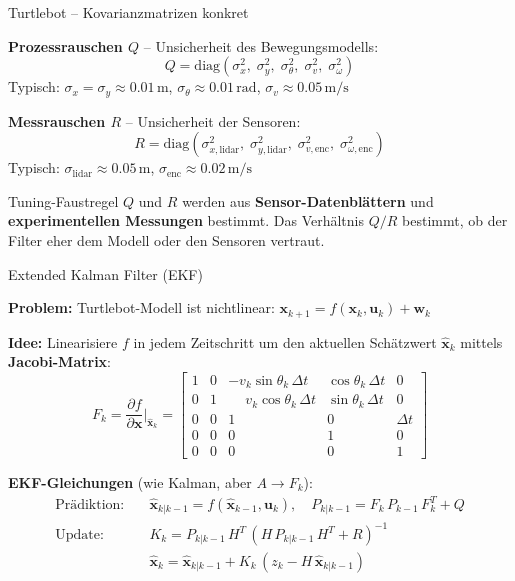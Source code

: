 \documentclass[%
  aspectratio=169,
  10pt
]{beamer}
\newcommand{\SI}[2]{#1\,\text{#2}}
\newcommand{\hl}[1]{{\color{fbblau}\textbf{#1}}}
\begin{document}
\begin{frame}{Turtlebot -- Kovarianzmatrizen konkret}

\textbf{Prozessrauschen $Q$} -- Unsicherheit des Bewegungsmodells:
\[
  Q = \mathrm{diag}\!\left(\sigma_x^2,\; \sigma_y^2,\; \sigma_\theta^2,\;
      \sigma_v^2,\; \sigma_\omega^2\right)
\]
Typisch: $\sigma_x = \sigma_y \approx \SI{0.01}{m}$, \;
$\sigma_\theta \approx \SI{0.01}{rad}$, \;
$\sigma_v \approx \SI{0.05}{m/s}$

\vspace{3mm}
\textbf{Messrauschen $R$} -- Unsicherheit der Sensoren:
\[
  R = \mathrm{diag}\!\left(\sigma_{x,\mathrm{lidar}}^2,\; \sigma_{y,\mathrm{lidar}}^2,\;
      \sigma_{v,\mathrm{enc}}^2,\; \sigma_{\omega,\mathrm{enc}}^2\right)
\]
Typisch: $\sigma_\mathrm{lidar} \approx \SI{0.05}{m}$, \;
$\sigma_\mathrm{enc} \approx \SI{0.02}{m/s}$

\vspace{3mm}
\begin{exampleblock}{Tuning-Faustregel}
  $Q$ und $R$ werden aus \textbf{Sensor-Datenblättern} und
  \textbf{experimentellen Messungen} bestimmt. Das Verhältnis $Q/R$ bestimmt,
  ob der Filter eher dem Modell oder den Sensoren vertraut.
\end{exampleblock}

\end{frame}


\begin{frame}{Extended Kalman Filter (EKF)}

\textbf{Problem:} Turtlebot-Modell ist nichtlinear:
$\mathbf{x}_{k+1} = f(\mathbf{x}_k, \mathbf{u}_k) + \mathbf{w}_k$

\vspace{2mm}
\textbf{Idee:} Linearisiere $f$ in jedem Zeitschritt um den aktuellen
Schätzwert $\hat{\mathbf{x}}_k$ mittels \hl{Jacobi-Matrix}:
\[
  F_k = \frac{\partial f}{\partial \mathbf{x}}\bigg|_{\hat{\mathbf{x}}_k}
  =
  \begin{bmatrix}
    1 & 0 & -v_k\sin\theta_k\,\Delta t & \cos\theta_k\,\Delta t & 0 \\
    0 & 1 & \phantom{-}v_k\cos\theta_k\,\Delta t & \sin\theta_k\,\Delta t & 0 \\
    0 & 0 & 1 & 0 & \Delta t \\
    0 & 0 & 0 & 1 & 0 \\
    0 & 0 & 0 & 0 & 1
  \end{bmatrix}
\]

\pause
\textbf{EKF-Gleichungen} (wie Kalman, aber $A \to F_k$):
\begin{align*}
  \text{Prädiktion:}\quad
    & \hat{\mathbf{x}}_{k|k-1} = f(\hat{\mathbf{x}}_{k-1}, \mathbf{u}_k),
    \quad P_{k|k-1} = F_k\,P_{k-1}\,F_k^T + Q \\
  \text{Update:}\quad
    & K_k = P_{k|k-1}\,H^T\,(H\,P_{k|k-1}\,H^T + R)^{-1} \\
    & \hat{\mathbf{x}}_k = \hat{\mathbf{x}}_{k|k-1} + K_k\,(z_k - H\,\hat{\mathbf{x}}_{k|k-1})
\end{align*}

\end{frame}
\end{document}
